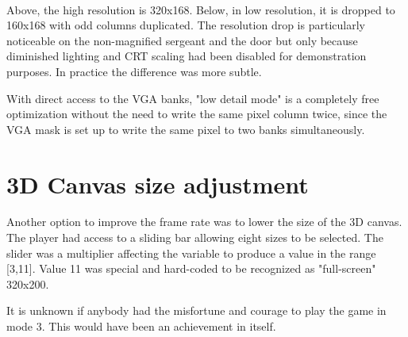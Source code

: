 \vspace{-6pt}
\\
\par
Above, the high resolution is 320x168. Below, in low resolution, it is dropped to 160x168 with odd columns duplicated. The resolution drop is particularly noticeable on the non-magnified sergeant and the door but only because diminished lighting and CRT scaling had been disabled for demonstration purposes. In practice the difference was more subtle.\\
\par
With direct access to the VGA banks, "low detail mode" is a completely free optimization without the need to write the same pixel column twice, since the VGA mask is set up to write the same pixel to two banks simultaneously.\\
\par
\vspace{-3pt}

\vspace{-30pt}
\section{3D Canvas size adjustment}
Another option to improve the frame rate was to lower the size of the 3D canvas. The player had access to a sliding bar allowing eight sizes to be selected. The slider was a multiplier affecting the variable  to produce a value in the range [3,11]. Value 11 was special and hard-coded to be recognized as "full-screen" 320x200.\\
\par
\vspace{4mm}
\par
It is unknown if anybody had the misfortune and courage to play the game in mode 3. This would have been an achievement in itself.\\
\par
{}
\par
{}

